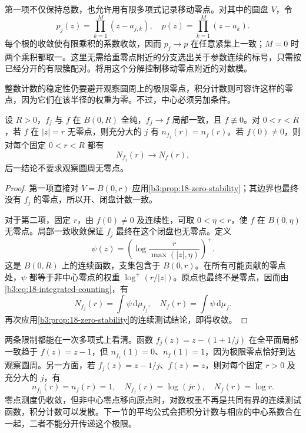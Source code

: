 第一项不仅保持总数，也允许用有限多项式记录移动零点。对其中的圆盘 \(V\)，令
\[
 p_j(z)=\prod_{k=1}^M(z-a_{j,k}),\quad
 p(z)=\prod_{k=1}^M(z-a_k).
\]
每个根的收敛使有限乘积的系数收敛，因而 \(p_j\to p\) 在任意紧集上一致；\(M=0\) 时两个乘积都取一。这里无需给重零点附近的分支选出关于参数连续的标号，只需按已经分开的有限簇配对。将用这个分解控制移动零点附近的对数模。

\ProseParagraphBreak

整数计数的稳定性仍要避开观察圆周上的极限零点，积分计数则可容许这样的零点，因为它们在该半径的权重为零。不过，中心必须另加条件。

\begin{corollary}[固定半径下的计数收敛]\label{b3:cor:18-counting-convergence}
设 \(R>0\)，\(f_j\) 与 \(f\) 在 \(B(0,R)\) 全纯，\(f_j\to f\) 局部一致，且 \(f\not\equiv0\)。对 \(0<r<R\)，若 \(f\) 在 \(|z|=r\) 无零点，则充分大的 \(j\) 有 \(n_{f_j}(r)=n_f(r)\)。若 \(f(0)\ne0\)，则对每个固定 \(0<r<R\) 都有
\[
 N_{f_j}(r)\longrightarrow N_f(r),
\]
后一结论不要求观察圆周无零点。
\end{corollary}
\begin{proof}
第一项直接对 \(V=B(0,r)\) 应用\cref{b3:prop:18-zero-stability}；其边界也最终没有 \(f_j\) 的零点，所以开、闭盘计数一致。

对于第二项，固定 \(r\)，由 \(f(0)\ne0\) 及连续性，可取 \(0<\eta<r\)，使 \(f\) 在 \(\overline{B(0,\eta)}\) 无零点。局部一致收敛保证 \(f_j\) 最终在这个闭盘也无零点。定义
\[
 \psi(z)=\left(\log\frac{r}{\max(|z|,\eta)}\right)^+.
\]
这是 \(B(0,R)\) 上的连续函数，支集包含于 \(\overline{B(0,r)}\)。在所有可能贡献的零点处，\(\psi\) 都等于非中心零点的权重 \(\log^+(r/|z|)\)。原点也最终不是零点，因而由\eqref{b3:eq:18-integrated-counting}，有
\[
 N_{f_j}(r)=\int\psi\,\mathrm d\mu_{f_j},\quad
 N_f(r)=\int\psi\,\mathrm d\mu_f.
\]
再次应用\cref{b3:prop:18-zero-stability}的连续测试结论，即得收敛。
\end{proof}

两条限制都能在一次多项式上看清。函数 \(f_j(z)=z-(1+1/j)\) 在全平面局部一致趋于 \(f(z)=z-1\)，但 \(n_{f_j}(1)=0\)、\(n_f(1)=1\)，因为极限零点恰好到达观察圆周。另一方面，若 \(f_j(z)=z-1/j\)、\(f(z)=z\)，则对每个固定 \(r>0\) 及充分大的 \(j\)，有
\[
 n_{f_j}(r)=n_f(r)=1,\quad
 N_{f_j}(r)=\log(jr),\quad N_f(r)=\log r.
\]
零点测度仍收敛，但非中心零点移向原点时，对数权重不再是共同有界的连续测试函数，积分计数可以发散。下一节的平均公式会把积分计数与相应的中心系数合在一起，二者不能分开传递这个极限。

\ProseParagraphBreak

